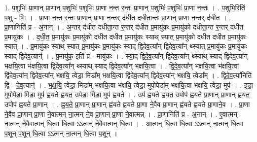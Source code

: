 \documentclass[17pt]{extarticle}
\begin{document}
1. प॒शुभिः॑ प्रा॒णान् प्रा॒णान् प॒शुभिः॑ प॒शुभिः॑ प्रा॒णा न॒न्त र॒न्तः प्रा॒णान् प॒शुभिः॑ प॒शुभिः॑ प्रा॒णा न॒न्तः । . प॒शुभि॒रिति॑ प॒शु - भिः॒ । . प्रा॒णा न॒न्त र॒न्तः प्रा॒णान् प्रा॒णा न॒न्तर् द॑धीत दधीता॒न्तः प्रा॒णान् प्रा॒णा न॒न्तर् द॑धीत । . प्रा॒णानिति॑ प्र - अ॒नान् । . अ॒न्तर् द॑धीत दधीता॒न्त र॒न्तर् द॑धीत प्र॒मायु॑कः प्र॒मायु॑को दधीता॒न्त र॒न्तर् द॑धीत प्र॒मायु॑कः । . द॒धी॒त॒ प्र॒मायु॑कः प्र॒मायु॑को दधीत दधीत प्र॒मायु॑कः स्याथ् स्यात् प्र॒मायु॑को दधीत दधीत प्र॒मायु॑कः स्यात् । . प्र॒मायु॑कः स्याथ् स्यात् प्र॒मायु॑कः प्र॒मायु॑कः स्याद् द्विदेव॒त्या᳚न् द्विदेव॒त्या᳚न् थ्स्यात् प्र॒मायु॑कः प्र॒मायु॑कः स्याद् द्विदेव॒त्यान्॑ । . प्र॒मायु॑क॒ इति॑ प्र - मायु॑कः । . स्या॒द् द्वि॒दे॒व॒त्या᳚न् द्विदेव॒त्या᳚न् थ्स्याथ् स्याद् द्विदेव॒त्या᳚न् भक्षयि॒त्वा भ॑क्षयि॒त्वा द्वि॑देव॒त्या᳚न् थ्स्याथ् स्याद् द्विदेव॒त्या᳚न् भक्षयि॒त्वा । . द्वि॒दे॒व॒त्या᳚न् भक्षयि॒त्वा भ॑क्षयि॒त्वा द्वि॑देव॒त्या᳚न् द्विदेव॒त्या᳚न् भक्षयि॒ त्वेडा॒ मिडा᳚म् भक्षयि॒त्वा द्वि॑देव॒त्या᳚न् द्विदेव॒त्या᳚न् भक्षयि॒ त्वेडा᳚म् । . द्वि॒दे॒व॒त्या॑निति॑ द्वि - दे॒व॒त्यान्॑ । . भ॒क्ष॒यि॒ त्वेडा॒ मिडा᳚म् भक्षयि॒त्वा भ॑क्षयि॒ त्वेडा॒ मुपोपेडा᳚म् भक्षयि॒त्वा भ॑क्षयि॒ त्वेडा॒ मुप॑ । . इडा॒ मुपोपेडा॒ मिडा॒ मुप॑ ह्वयते ह्वयत॒ उपेडा॒ मिडा॒ मुप॑ ह्वयते । . उप॑ ह्वयते ह्वयत॒ उपोप॑ ह्वयते प्रा॒णान् प्रा॒णान् ह्व॑यत॒ उपोप॑ ह्वयते प्रा॒णान् । . ह्व॒य॒ते॒ प्रा॒णान् प्रा॒णान् ह्व॑यते ह्वयते प्रा॒णा ने॒वैव प्रा॒णान् ह्व॑यते ह्वयते प्रा॒णाने॒व । . प्रा॒णा ने॒वैव प्रा॒णान् प्रा॒णा ने॒वात्मन् ना॒त्मन् ने॒व प्रा॒णान् प्रा॒णा ने॒वात्मन्न् । . प्रा॒णानिति॑ प्र - अ॒नान् । . ए॒वात्मन् ना॒त्मन् ने॒वैवात्मन् धि॒त्वा धि॒त्वा ऽऽत्मन् ने॒वैवात्मन् धि॒त्वा । . आ॒त्मन् धि॒त्वा धि॒त्वा ऽऽत्मन् ना॒त्मन् धि॒त्वा प॒शून् प॒शून् धि॒त्वा ऽऽत्मन् ना॒त्मन् धि॒त्वा प॒शून् । \newline
\end{document}
